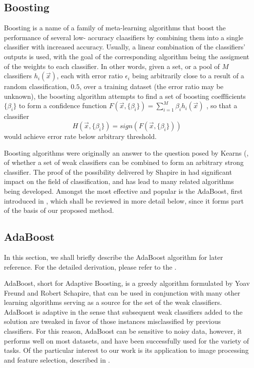\subsection{Boosting}
Boosting is a name of a family of meta-learning algorithms that boost the performance of several low- accuracy claasifiers by combining them into a single classifier with increased accuracy. Usually, a linear combination of the classifiers' outputs is used, with the goal of the corresponding algorithm being the assigment of the  weights to each classifier. In other words, given a set, or a pool of $M$ classifiers $h_i(\vec{x})$, each with error ratio $\epsilon_i$ being arbitrarily close to a result of a random classification, $0.5$,  over a training dataset (the error ratio may be unknown), the boosting algorithm attempts to find a set of boosting coeffficients $\{\beta_i\}$ to form a confidence function $F(\vec{x},\{\beta_i\})=\sum_{i=1}^{M}\beta_i h_i(\vec{x})$ , so that a classifier
\begin{equation}
\label{BoostingClassifier}
H(\vec{x},\{\beta_i\})=sign(F(\vec{x},\{\beta_i\}))
\end{equation}
would achieve error rate below arbitrary threshold.

Boosting algorithms were originally an answer to the question posed by Kearns (\cite{kearns}, of whether a set of weak classifiers can be combined to form an arbitrary strong classifier. The proof of the possibility delivered by Shapire in \cite{schap} had significant impact on the field of classification, and has lead to many related algorithms being developed. Amongst the most effective and popular is the AdaBoost, first introduced in \cite{adaor}, which shall be reviewed in more detail below, since it forms part of the basis of our proposed method.

\subsection{AdaBoost} 

In this section, we shall briefly describe the AdaBoost algorithm for later reference. For the detailed derivation, please refer to the \cite{adaor}.

AdaBoost, short for Adaptive Boosting, is a greedy algorithm formulated by Yoav Freund and Robert Schapire, that can be used in conjunction with many other learning algorithms serving as a source for the set of the weak classifiers. AdaBoost is adaptive in the sense that subsequent weak classifiers added to the solution are tweaked in favor of those instances misclassified by previous classifiers. For this reason,  AdaBoost can be sensitive to noisy data, however, it performs well on most datasets, and have been successfully used for the variety of tasks.  Of the particular interest to our work is its application to image processing and feature selection, described in \cite{OnlineBoost}. 

